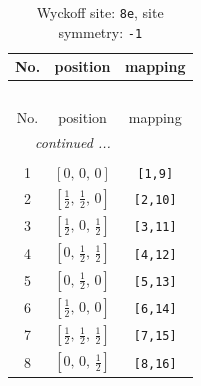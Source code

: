 \documentclass[fleqn,8pt]{jsarticle}
\begin{document}
\renewcommand{\arraystretch}{1.2}
\begin{longtable}{ccc}
\caption{Wyckoff site: {\tt 8e}, site symmetry: {\tt -1}}
 \\
 \hline \hline
No. & position & mapping \\ \hline \endfirsthead

\multicolumn{2}{l}{\tablename\ \thetable{}} \\
 \hline \hline
No. & position & mapping \\ \hline \endhead

 \hline \hline
\multicolumn{2}{r}{\footnotesize\it continued ...} \\ \endfoot

 \hline \hline
\multicolumn{2}{r}{} \\ \endlastfoot

1 & $\left[ 0,\, 0,\, 0 \right]$ & {\tt [1,9]} \\ \hline
2 & $\left[ \frac{1}{2},\, \frac{1}{2},\, 0 \right]$ & {\tt [2,10]} \\ \hline
3 & $\left[ \frac{1}{2},\, 0,\, \frac{1}{2} \right]$ & {\tt [3,11]} \\ \hline
4 & $\left[ 0,\, \frac{1}{2},\, \frac{1}{2} \right]$ & {\tt [4,12]} \\ \hline
5 & $\left[ 0,\, \frac{1}{2},\, 0 \right]$ & {\tt [5,13]} \\ \hline
6 & $\left[ \frac{1}{2},\, 0,\, 0 \right]$ & {\tt [6,14]} \\ \hline
7 & $\left[ \frac{1}{2},\, \frac{1}{2},\, \frac{1}{2} \right]$ & {\tt [7,15]} \\ \hline
8 & $\left[ 0,\, 0,\, \frac{1}{2} \right]$ & {\tt [8,16]} \\
\end{longtable}
\renewcommand{\arraystretch}{1.2}
\end{document}
